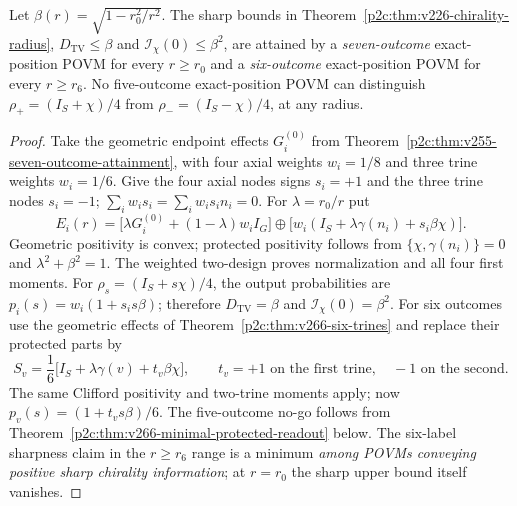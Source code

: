 \documentclass[12pt,a4paper]{article}
\begin{document}
\begin{theorem}
\label{p2c:thm:v266-sharp-chirality-support}
Let $\beta(r)=\sqrt{1-r_0^2/r^2}$. The sharp bounds in
Theorem~\ref{p2c:thm:v226-chirality-radius},
$D_{\mathrm{TV}}\le\beta$ and $\mathcal I_\chi(0)\le\beta^2$,
are attained by a \emph{seven-outcome} exact-position POVM for every
$r\ge r_0$ and a \emph{six-outcome} exact-position POVM for every
$r\ge r_6$. No five-outcome exact-position POVM can distinguish
$\rho_+=(I_S+\chi)/4$ from $\rho_-=(I_S-\chi)/4$, at any radius.
\end{theorem}
\begin{proof}
Take the geometric endpoint effects $G_i^{(0)}$ from
Theorem~\ref{p2c:thm:v255-seven-outcome-attainment}, with four axial
weights $w_i=1/8$ and three trine weights $w_i=1/6$. Give the four
axial nodes signs $s_i=+1$ and the three trine nodes $s_i=-1$;
$\sum_iw_is_i=\sum_iw_is_in_i=0$. For $\lambda=r_0/r$ put
\[
E_i(r)=\bigl[\lambda G_i^{(0)}+(1-\lambda)w_iI_G\bigr]
\oplus\bigl[w_i(I_S+\lambda\gamma(n_i)+s_i\beta\chi)\bigr].
\]
Geometric positivity is convex; protected positivity follows from
$\{\chi,\gamma(n_i)\}=0$ and $\lambda^2+\beta^2=1$.
The weighted two-design proves normalization and all four first moments.
For $\rho_s=(I_S+s\chi)/4$, the output probabilities are
$p_i(s)=w_i(1+s_is\beta)$; therefore
$D_{\mathrm{TV}}=\beta$ and $\mathcal I_\chi(0)=\beta^2$.
For six outcomes use the geometric effects of
Theorem~\ref{p2c:thm:v266-six-trines} and replace their protected parts by
\[
S_v=\frac16\bigl[I_S+\lambda\gamma(v)+t_v\beta\chi\bigr],
\qquad t_v=+1\text{ on the first trine},\quad -1\text{ on the second}.
\]
The same Clifford positivity and two-trine moments apply; now
$p_v(s)=(1+t_vs\beta)/6$. The five-outcome no-go follows from
Theorem~\ref{p2c:thm:v266-minimal-protected-readout} below.
The six-label sharpness claim in the $r\ge r_6$ range is a minimum
\emph{among POVMs conveying positive sharp chirality information};
at $r=r_0$ the sharp upper bound itself vanishes.
\end{proof}
\end{document}
